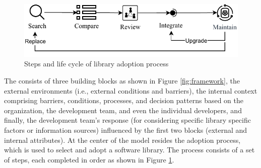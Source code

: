 \begin{figure}
    \centering
    \includegraphics[scale=0.8  ]{images/Library-selection-process.pdf}
    \caption{Steps and life cycle of library adoption process}
    \label{fig:selection-process}
\end{figure}

The {\model} consists of three building blocks as shown in Figure \ref{fig:framework}, the external environments (i.e., external conditions and barriers), the internal context comprising barriers, conditions, processes, and decision patterns based on the organization, the development team, and even the individual developers, and finally, the development team's response (for considering specific library specific factors or information sources) influenced by the first two blocks (external and internal attributes). 
At the center of the model resides the adoption process, which is used to select and adopt a software library. The process consists of a set of steps, each completed in order as shown in Figure \ref{fig:selection-process}. 




